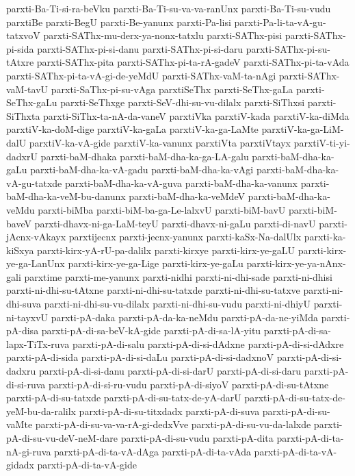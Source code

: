 {parxti-Ba-Ti-si-ra-beVku
parxti-Ba-Ti-su-va-va-ranUnx
parxti-Ba-Ti-su-vudu
parxtiBe
parxti-BegU
parxti-Be-yanunx
parxti-Pa-lisi
parxti-Pa-li-ta-vA-gu-tatxvoV
parxti-SAThx-mu-derx-ya-nonx-tatxlu
parxti-SAThx-pisi
parxti-SAThx-pi-sida
parxti-SAThx-pi-si-danu
parxti-SAThx-pi-si-daru
parxti-SAThx-pi-su-tAtxre
parxti-SAThx-pita
parxti-SAThx-pi-ta-rA-gadeV
parxti-SAThx-pi-ta-vAda
parxti-SAThx-pi-ta-vA-gi-de-yeMdU
parxti-SAThx-vaM-ta-nAgi
parxti-SAThx-vaM-tavU
parxti-SaThx-pi-su-vAga
parxtiSeThx
parxti-SeThx-gaLa
parxti-SeThx-gaLu
parxti-SeThxge
parxti-SeV-dhi-su-vu-dilalx
parxti-SiThxsi
parxti-SiThxta
parxti-SiThx-ta-nA-da-vaneV
parxtiVka
parxtiV-kada
parxtiV-ka-diMda
parxtiV-ka-doM-dige
parxtiV-ka-gaLa
parxtiV-ka-ga-LaMte
parxtiV-ka-ga-LiM-dalU
parxtiV-ka-vA-gide
parxtiV-ka-vanunx
parxtiVta
parxtiVtayx
parxtiV-ti-yi-dadxrU
parxti-baM-dhaka
parxti-baM-dha-ka-ga-LA-galu
parxti-baM-dha-ka-gaLu
parxti-baM-dha-ka-vA-gadu
parxti-baM-dha-ka-vAgi
parxti-baM-dha-ka-vA-gu-tatxde
parxti-baM-dha-ka-vA-guva
parxti-baM-dha-ka-vanunx
parxti-baM-dha-ka-veM-bu-danunx
parxti-baM-dha-ka-veMdeV
parxti-baM-dha-ka-veMdu
parxti-biMba
parxti-biM-ba-ga-Le-lalxvU
parxti-biM-bavU
parxti-biM-baveV
parxti-dhavx-ni-ga-LaM-teyU
parxti-dhavx-ni-gaLu
parxti-di-navU
parxti-jAcnx-vAkayx
parxtijecnx
parxti-jecnx-yanunx
parxti-kaSx-Na-dalUlx
parxti-ka-kiSxya
parxti-kirx-yA-rU-pa-dalilx
parxti-kirxye
parxti-kirx-ye-gaLU
parxti-kirx-ye-ga-LanUnx
parxti-kirx-ye-ga-Lige
parxti-kirx-ye-gaLu
parxti-kirx-ye-ya-nAnx-gali
parxtime
parxti-me-yanunx
parxti-nidhi
parxti-ni-dhi-sade
parxti-ni-dhisi
parxti-ni-dhi-su-tAtxne
parxti-ni-dhi-su-tatxde
parxti-ni-dhi-su-tatxve
parxti-ni-dhi-suva
parxti-ni-dhi-su-vu-dilalx
parxti-ni-dhi-su-vudu
parxti-ni-dhiyU
parxti-ni-tayxvU
parxti-pA-daka
parxti-pA-da-ka-neMdu
parxti-pA-da-ne-yiMda
parxti-pA-disa
parxti-pA-di-sa-beV-kA-gide
parxti-pA-di-sa-lA-yitu
parxti-pA-di-sa-lapx-TiTx-ruva
parxti-pA-di-salu
parxti-pA-di-si-dAdxne
parxti-pA-di-si-dAdxre
parxti-pA-di-sida
parxti-pA-di-si-daLu
parxti-pA-di-si-dadxnoV
parxti-pA-di-si-dadxru
parxti-pA-di-si-danu
parxti-pA-di-si-darU
parxti-pA-di-si-daru
parxti-pA-di-si-ruva
parxti-pA-di-si-ru-vudu
parxti-pA-di-siyoV
parxti-pA-di-su-tAtxne
parxti-pA-di-su-tatxde
parxti-pA-di-su-tatx-de-yA-darU
parxti-pA-di-su-tatx-de-yeM-bu-da-ralilx
parxti-pA-di-su-titxdadx
parxti-pA-di-suva
parxti-pA-di-su-vaMte
parxti-pA-di-su-va-va-rA-gi-dedxVve
parxti-pA-di-su-vu-da-lalxde
parxti-pA-di-su-vu-deV-neM-dare
parxti-pA-di-su-vudu
parxti-pA-dita
parxti-pA-di-ta-nA-gi-ruva
parxti-pA-di-ta-vA-dAga
parxti-pA-di-ta-vAda
parxti-pA-di-ta-vA-gidadx
parxti-pA-di-ta-vA-gide
}
